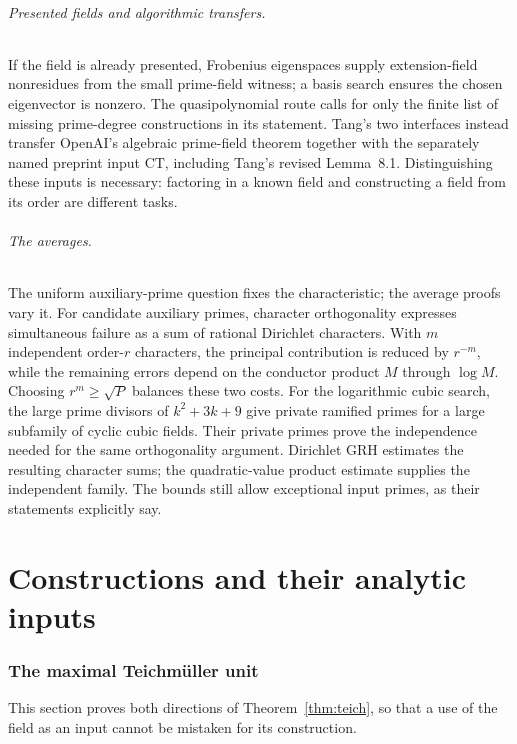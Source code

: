 \documentclass[11pt]{article}
\theoremstyle{definition}
\theoremstyle{remark}
\begin{document}
\paragraph{Presented fields and algorithmic transfers.}
If the field is already presented, Frobenius eigenspaces supply
extension-field nonresidues from the small prime-field witness; a
basis search ensures the chosen eigenvector is nonzero. The
quasipolynomial route calls for only the finite list of missing
prime-degree constructions in its statement. Tang's two interfaces
instead transfer OpenAI's algebraic prime-field theorem together
with the separately named preprint input \(\mathrm{CT}\), including
Tang's revised Lemma~8.1. Distinguishing these inputs is necessary:
factoring in a known field and constructing a field from its order
are different tasks.

\paragraph{The averages.}
The uniform auxiliary-prime question fixes the characteristic; the
average proofs vary it. For candidate auxiliary primes, character
orthogonality expresses simultaneous failure as a sum of rational
Dirichlet characters. With \(m\) independent order-\(r\)
characters, the principal contribution is reduced by \(r^{-m}\),
while the remaining errors depend on the conductor product \(M\)
through \(\log M\). Choosing \(r^m\geq\sqrt P\) balances
these two costs. For the logarithmic cubic search, the large prime
divisors of \(k^2+3k+9\) give private ramified primes for a large
subfamily of cyclic cubic fields. Their private primes prove the
independence needed for the same orthogonality argument. Dirichlet
GRH estimates the resulting character sums; the quadratic-value
product estimate supplies the independent family. The bounds still
allow exceptional input primes, as their statements explicitly say.

\part{Constructions and their analytic inputs}

\section{The maximal Teichm\"uller unit}
This section proves both directions of Theorem~\ref{thm:teich},
so that a use of the field as an input cannot be mistaken for its construction.
\end{document}
